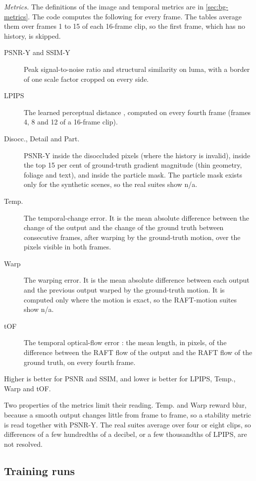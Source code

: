 \emph{Metrics.} The definitions of the image and temporal metrics are in \cref{sec:bg-metrics}. The code computes the following for every frame. The tables average them over frames 1 to 15 of each 16-frame clip, so the first frame, which has no history, is skipped.
\begin{description}
\item[PSNR-Y and SSIM-Y] Peak signal-to-noise ratio and structural similarity \cite{wang2004ssim} on luma, with a border of one scale factor cropped on every side.
\item[LPIPS] The learned perceptual distance \cite{zhang2018lpips}, computed on every fourth frame (frames 4, 8 and 12 of a 16-frame clip).
\item[Disocc., Detail and Part.] PSNR-Y inside the disoccluded pixels (where the history is invalid), inside the top 15 per cent of ground-truth gradient magnitude (thin geometry, foliage and text), and inside the particle mask. The particle mask exists only for the synthetic scenes, so the real suites show n/a.
\item[Temp.] The temporal-change error. It is the mean absolute difference between the change of the output and the change of the ground truth between consecutive frames, after warping by the ground-truth motion, over the pixels visible in both frames.
\item[Warp] The warping error. It is the mean absolute difference between each output and the previous output warped by the ground-truth motion. It is computed only where the motion is exact, so the RAFT-motion suites show n/a.
\item[tOF] The temporal optical-flow error \cite{chu2020tecogan}: the mean length, in pixels, of the difference between the RAFT flow of the output and the RAFT flow of the ground truth, on every fourth frame.
\end{description}
Higher is better for PSNR and SSIM, and lower is better for LPIPS, Temp., Warp and tOF.

Two properties of the metrics limit their reading. Temp. and Warp reward blur, because a smooth output changes little from frame to frame, so a stability metric is read together with PSNR-Y. The real suites average over four or eight clips, so differences of a few hundredths of a decibel, or a few thousandths of LPIPS, are not resolved.

\subsection{Training runs}\label{sec:tsrr-training}

